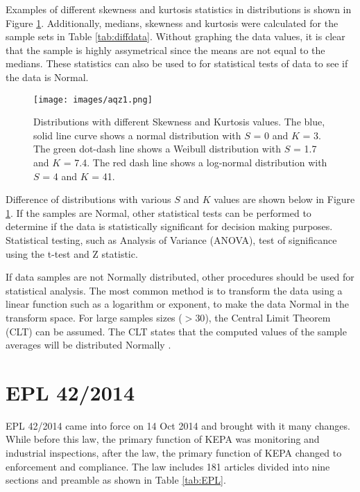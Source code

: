 Examples of different skewness and kurtosis statistics in distributions is shown in Figure \ref{fig:distr}. Additionally, medians, skewness and kurtosis were calculated for the sample sets in Table \ref{tab:diffdata}. Without graphing the data values, it is clear that the sample is highly assymetrical since the means are not equal to the medians. These statistics can also be used to for statistical tests of data to see if the data is Normal. 
%
\begin{figure}[H]
\centering
\texttt{[image: images/aqz1.png]} 
\caption[Distributions with different Skewness and Kurtosis values.]{Distributions with different Skewness and Kurtosis values. The blue, solid line curve shows a normal distribution with $S$ = 0 and $K$ = 3. The green dot-dash line shows a Weibull distribution with $S$ = 1.7 and $K$ = 7.4.  The red dash line shows a log-normal distribution with $S$ = 4 and $K$ = 41. }
\label{fig:distr}
\end{figure}
%
Difference of distributions with various $S$ and $K$ values are shown below in Figure \ref{fig:distr}.  If the samples are Normal, other statistical tests can be performed to determine if the data is statistically significant for decision making purposes. Statistical testing, such as Analysis of Variance (ANOVA), test of significance using the t-test and Z statistic.

If data samples are not Normally distributed, other procedures should be used for statistical analysis. The most common method is to transform the data using a linear function such as a logarithm or exponent, to make the data Normal in the transform space. For large samples sizes ($>30$), the Central Limit Theorem (CLT) can be assumed. The CLT states that the computed values of the sample averages will be distributed Normally \citep{Freeman2017a}. 

\section{EPL 42/2014}

EPL 42/2014 came into force on 14 Oct 2014 and brought with it many changes. While before this law, the primary function of KEPA was monitoring and industrial inspections, after the law, the primary function of KEPA changed to enforcement and compliance. The law includes 181 articles divided into nine sections and preamble as  shown in Table \ref{tab:EPL}.

